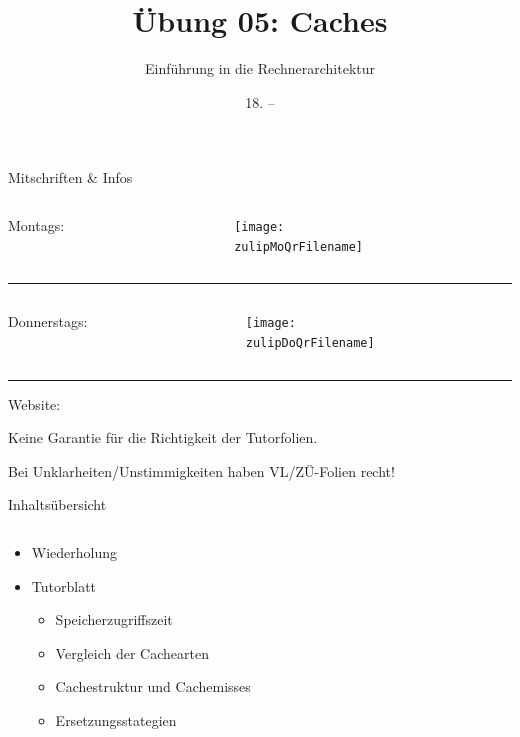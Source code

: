 \documentclass[
  german,            %
  aspectratio=169,    %
]{tumbeamer}
\title{Übung 05: Caches}
\subtitle{Einführung in die Rechnerarchitektur}
\author{\theAuthorName}
\institute{\theGroupName\\\theSchoolName\\\theUniversityName}
\date{18. -- \DTMdisplaydate{2024}{11}{24}{-1}}
\begin{document}
\maketitle

\begin{frame}[c]{Mitschriften \& Infos}{}
  \begin{minipage}[t]{\textwidth}
    \begin{columns}[c]
      \begin{column}{0.8\textwidth}
        Montags: \href{\zulipMo}{\zulipMo}
      \end{column}
      \begin{column}{0.2\textwidth}
        \texttt{[image: \\zulipMoQrFilename]}
      \end{column}
    \end{columns}
  \end{minipage}
  \rule{\textwidth}{0.4pt}
  \begin{minipage}[t]{\textwidth}
    \begin{columns}[c]
      \begin{column}{0.8\textwidth}
        Donnerstags: \href{\zulipDo}{\zulipDo}
      \end{column}
      \begin{column}{0.2\textwidth}
        \texttt{[image: \\zulipDoQrFilename]}
      \end{column}
    \end{columns}
  \end{minipage}
  \ifdefined\myWebsite
  \rule{\textwidth}{0.4pt}
  \centering
  Website: \href{\myWebsite}{\myWebsite}
  \fi
\end{frame}

\begin{frame}[c]{}{}
  \begin{center}
    \LARGE  Keine Garantie für die Richtigkeit der Tutorfolien.

    \Large Bei Unklarheiten/Unstimmigkeiten haben VL/ZÜ-Folien recht!
  \end{center}
\end{frame}

\begin{frame}[c]{Inhaltsübersicht}{}
  \begin{columns}[c]
    \begin{column}{1\textwidth}
      \begin{itemize}
        \item Wiederholung
        \item Tutorblatt
        \begin{itemize}
          \item Speicherzugriffszeit
          \item Vergleich der Cachearten
          \item Cachestruktur und Cachemisses
          \item Ersetzungsstategien
        \end{itemize}
      \end{itemize}
    \end{column}
  \end{columns}
\end{frame}
\end{document}
